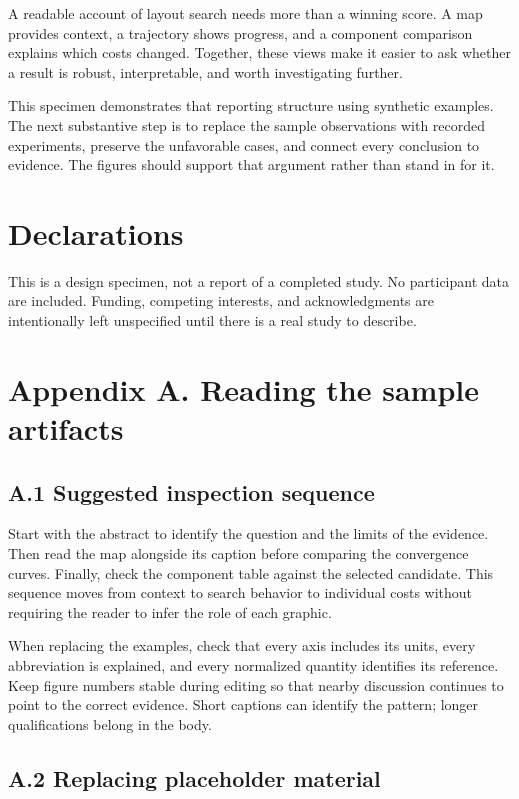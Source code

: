 \documentclass{gecko-paper}
\begin{document}
\begin{paperbody}
A readable account of layout search needs more than a winning score. A map provides context, a trajectory shows progress, and a component comparison explains which costs changed. Together, these views make it easier to ask whether a result is robust, interpretable, and worth investigating further.

This specimen demonstrates that reporting structure using synthetic examples. The next substantive step is to replace the sample observations with recorded experiments, preserve the unfavorable cases, and connect every conclusion to evidence. The figures should support that argument rather than stand in for it.

\section*{Declarations}
This is a design specimen, not a report of a completed study. No participant data are included. Funding, competing interests, and acknowledgments are intentionally left unspecified until there is a real study to describe.

\section*{Appendix A. Reading the sample artifacts}

\subsection*{A.1 Suggested inspection sequence}

Start with the abstract to identify the question and the limits of the evidence. Then read the map alongside its caption before comparing the convergence curves. Finally, check the component table against the selected candidate. This sequence moves from context to search behavior to individual costs without requiring the reader to infer the role of each graphic.

When replacing the examples, check that every axis includes its units, every abbreviation is explained, and every normalized quantity identifies its reference. Keep figure numbers stable during editing so that nearby discussion continues to point to the correct evidence. Short captions can identify the pattern; longer qualifications belong in the body.

\subsection*{A.2 Replacing placeholder material}


\end{paperbody}
\end{document}
